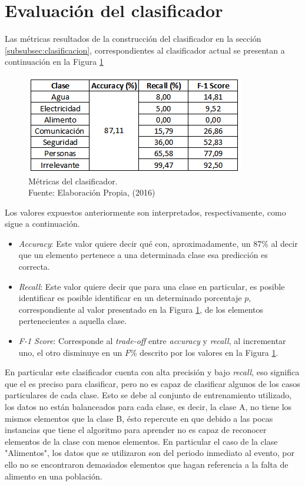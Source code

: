 \section{Evaluación del clasificador}
\label{sec:EvalClassificador}

Las métricas resultados de la construcción del clasificador en la sección \ref{subsubsec:clasificacion}, correspondientes al clasificador actual se presentan a continuación en la Figura \ref{fig:metricasClass} 
\begin{figure}[H]
        \centering
        \captionsetup{justification=centering}
        \includegraphics[scale=0.8]{images/MetricasClasificador.png}
        \caption[Métricas del clasificador.]{Métricas del clasificador.\\Fuente: Elaboración Propia, (2016)}
        \label{fig:metricasClass}
\end{figure}

Los valores expuestos anteriormente son interpretados, respectivamente, como sigue a continuación.

\begin{itemize}
\item \textit{Accuracy}: Este valor quiere decir qué con, aproximadamente, un 87\% al decir que un elemento pertenece a una determinada clase esa predicción es correcta.
\item \textit{Recall}: Este valor quiere decir que para una clase en particular, es posible identificar es posible identificar en un determinado porcentaje $p$, correspondiente al valor presentado en la Figura \ref{fig:metricasClass}, de los elementos pertenecientes a aquella clase.
\item \textit{F-1 Score}: Corresponde al \textit{trade-off} entre \textit{accuracy} y \textit{recall}, al incrementar uno, el otro disminuye en un $F$\% descrito por los valores en la Figura \ref{fig:metricasClass}.
\end{itemize}

En particular este clasificador cuenta con alta precisión y bajo \textit{recall}, eso significa que el es preciso para clasificar, pero no es capaz de clasificar algunos de los casos particulares de cada clase. Esto se debe al conjunto de entrenamiento utilizado, los datos no están balanceados para cada clase, es decir, la clase A, no tiene los mismos elementos que la clase B, ésto repercute en que debido a las pocas instancias que tiene el algoritmo para aprender no es capaz de reconocer elementos de la clase con menos elementos. En particular el caso de la clase "Alimentos", los datos que se utilizaron son del periodo inmediato al evento, por ello no se encontraron demasiados elementos que hagan referencia a la falta de alimento en una población.

